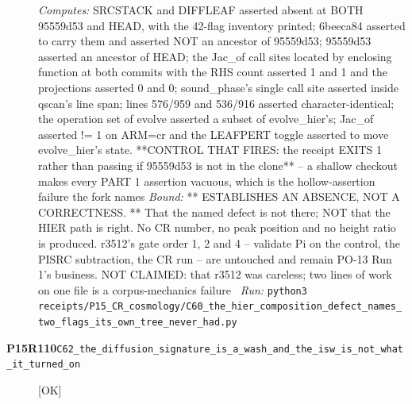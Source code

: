 \begin{description}
\emph{Computes:} SRCSTACK and DIFFLEAF asserted absent at BOTH 95559d53 and HEAD, with the 42-flag inventory printed; 6beeca84 asserted to carry them and asserted NOT an ancestor of 95559d53; 95559d53 asserted an ancestor of HEAD; the Jac\_of call sites located by enclosing function at both commits with the RHS count asserted 1 and 1 and the projections asserted 0 and 0; sound\_phase's single call site asserted inside qscan's line span; lines 576/959 and 536/916 asserted character-identical; the operation set of evolve asserted a subset of evolve\_hier's; Jac\_of asserted != 1 on ARM=cr and the LEAFPERT toggle asserted to move evolve\_hier's state. **CONTROL THAT FIRES: the receipt EXITS 1 rather than passing if 95559d53 is not in the clone** -- a shallow checkout makes every PART 1 assertion vacuous, which is the hollow-assertion failure the fork names
 \emph{Bound:} ** ESTABLISHES AN ABSENCE, NOT A CORRECTNESS. ** That the named defect is not there; NOT that the HIER path is right. No CR number, no peak position and no height ratio is produced. r3512's gate order 1, 2 and 4 -- validate Pi on the control, the PISRC subtraction, the CR run -- are untouched and remain PO-13 Run 1's business. NOT CLAIMED: that r3512 was careless; two lines of work on one file is a corpus-mechanics failure
\ \emph{Run:} \texttt{python3 receipts/P15\_CR\_cosmology/C60\_the\_hier\_composition\_defect\_names\_two\_flags\_its\_own\_tree\_never\_had.py}
\item[\rcptlabel{C62_the_diffusion_signature_is_a_wash_and_the_isw_is_not_what_it_turned_on}{P15R110}\textbf{P15R110}\quad\texttt{C62\_the\_diffusion\_signature\_is\_a\_wash\_and\_the\_isw\_is\_not\_what\_it\_turned\_on}]\hfill\textsf{[OK]}\\

\end{description}

